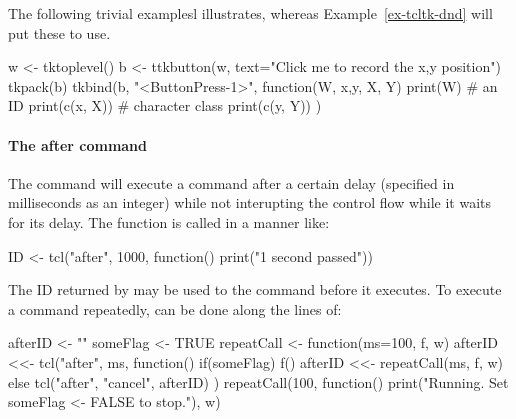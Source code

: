 The following trivial examplesl illustrates, whereas
Example~\ref{ex-tcltk-dnd} will put these to use.

\begin{Schunk}
\begin{Sinput}
 w <- tktoplevel()
 b <- ttkbutton(w, text="Click me to record the x,y position")
 tkpack(b)
 tkbind(b, "<ButtonPress-1>", function(W, x,y, X, Y) {
   print(W)                              # an ID
   print(c(x, X))                        # character class
   print(c(y, Y))
   })
\end{Sinput}
\end{Schunk}




\paragraph{The after command}
The \TCL\/ command  will execute a command after a certain
delay (specified in milliseconds as an integer) while not interupting
the control flow while it waits for its delay. The function is called
in a manner like:
\begin{Schunk}
  \begin{Sinput}
    ID <- tcl("after", 1000, function() print("1 second passed"))    
  \end{Sinput}
\end{Schunk}
The ID returned by  may be used to  the
command before it executes. To execute a command repeatedly, can be
done along the lines of:
\begin{Schunk}
\begin{Sinput}
 afterID <- ""
 someFlag <- TRUE
 repeatCall <- function(ms=100, f, w) {
   afterID <<- tcl("after", ms, function() {
     if(someFlag) {                      
       f()
       afterID <<- repeatCall(ms, f, w)
     }  else {
       tcl("after", "cancel", afterID)
     }
   })
 }
 repeatCall(100, function() print("Running. Set someFlag <- FALSE to stop."), w)
\end{Sinput}
\end{Schunk}
%


